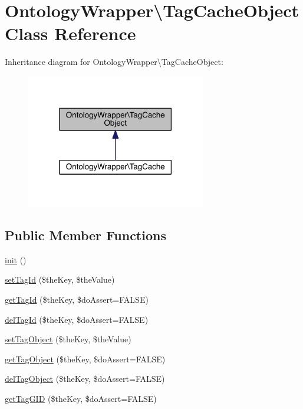 \hypertarget{class_ontology_wrapper_1_1_tag_cache_object}{\section{Ontology\-Wrapper\textbackslash{}Tag\-Cache\-Object Class Reference}
\label{class_ontology_wrapper_1_1_tag_cache_object}
}


Inheritance diagram for Ontology\-Wrapper\textbackslash{}Tag\-Cache\-Object\-:
\nopagebreak
\begin{figure}[H]
\begin{center}
\leavevmode
\includegraphics[width=222pt]{class_ontology_wrapper_1_1_tag_cache_object__inherit__graph}
\end{center}
\end{figure}
\subsection*{Public Member Functions}
\begin{DoxyCompactItemize}
\item 
\hyperlink{class_ontology_wrapper_1_1_tag_cache_object_a560d3ea289197fbcc0268590bd4c937c}{init} ()
\item 
\hyperlink{class_ontology_wrapper_1_1_tag_cache_object_a5623fe3e494a29d7518abc5ffe76e688}{set\-Tag\-Id} (\$the\-Key, \$the\-Value)
\item 
\hyperlink{class_ontology_wrapper_1_1_tag_cache_object_a136e04c97cbefe02abd6f237f2118287}{get\-Tag\-Id} (\$the\-Key, \$do\-Assert=F\-A\-L\-S\-E)
\item 
\hyperlink{class_ontology_wrapper_1_1_tag_cache_object_a3374f814f4a1d96470932d105761eead}{del\-Tag\-Id} (\$the\-Key, \$do\-Assert=F\-A\-L\-S\-E)
\item 
\hyperlink{class_ontology_wrapper_1_1_tag_cache_object_a219ea904f544bde247bd498108dec7e0}{set\-Tag\-Object} (\$the\-Key, \$the\-Value)
\item 
\hyperlink{class_ontology_wrapper_1_1_tag_cache_object_af9f3670137201be86107461026b70a10}{get\-Tag\-Object} (\$the\-Key, \$do\-Assert=F\-A\-L\-S\-E)
\item 
\hyperlink{class_ontology_wrapper_1_1_tag_cache_object_adc4d98f5c9b1ac96e04bd58107d5b557}{del\-Tag\-Object} (\$the\-Key, \$do\-Assert=F\-A\-L\-S\-E)
\item 
\hyperlink{class_ontology_wrapper_1_1_tag_cache_object_ac0cb491eae6addb59a132b8fb11f8c31}{get\-Tag\-G\-I\-D} (\$the\-Key, \$do\-Assert=F\-A\-L\-S\-E)
\end{DoxyCompactItemize}


